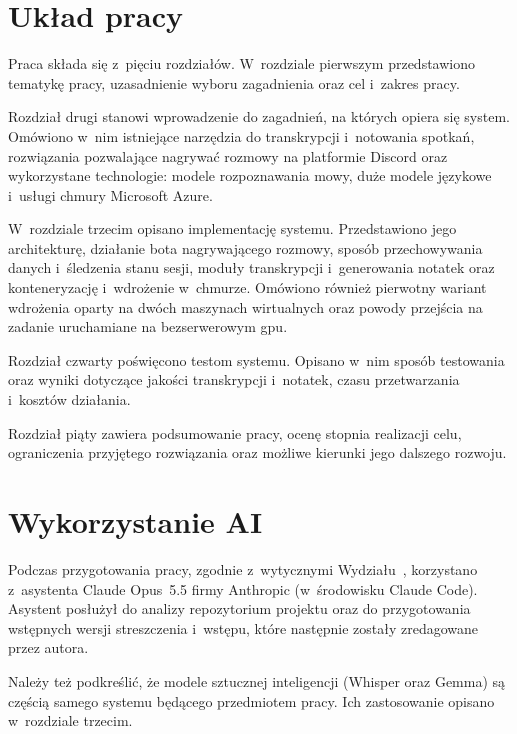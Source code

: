 \section{Układ pracy}
\label{sec:wstep:uklad}


Praca składa się z~pięciu rozdziałów. W~rozdziale pierwszym przedstawiono
tematykę pracy, uzasadnienie wyboru zagadnienia oraz cel i~zakres pracy.

Rozdział drugi stanowi wprowadzenie do zagadnień, na których opiera się
system. Omówiono w~nim istniejące narzędzia do transkrypcji i~notowania
spotkań, rozwiązania pozwalające nagrywać rozmowy na platformie Discord oraz
wykorzystane technologie: modele rozpoznawania mowy, duże modele językowe
i~usługi chmury Microsoft Azure.

W~rozdziale trzecim opisano implementację systemu. Przedstawiono jego
architekturę, działanie bota nagrywającego rozmowy, sposób przechowywania
danych i~śledzenia stanu sesji, moduły transkrypcji i~generowania notatek
oraz konteneryzację i~wdrożenie w~chmurze. Omówiono również pierwotny wariant
wdrożenia oparty na dwóch maszynach wirtualnych oraz powody przejścia na
zadanie uruchamiane na bezserwerowym \acs{gpu}.

Rozdział czwarty poświęcono testom systemu. Opisano w~nim sposób testowania
oraz wyniki dotyczące jakości transkrypcji i~notatek, czasu przetwarzania
i~kosztów działania.

Rozdział piąty zawiera podsumowanie pracy, ocenę stopnia realizacji celu,
ograniczenia przyjętego rozwiązania oraz możliwe kierunki jego dalszego
rozwoju.

\section{Wykorzystanie AI}
\label{sec:wstep:ai}


Podczas przygotowania pracy, zgodnie z~wytycznymi
Wydziału~\cite{WITWytyczneSI}, korzystano z~asystenta Claude Opus~5.5 firmy
Anthropic (w~środowisku Claude Code). Asystent posłużył do analizy
repozytorium projektu oraz do przygotowania wstępnych wersji streszczenia
i~wstępu, które następnie zostały zredagowane przez autora.

Należy też podkreślić, że modele sztucznej inteligencji (Whisper oraz Gemma)
są częścią samego systemu będącego przedmiotem pracy. Ich zastosowanie
opisano w~rozdziale trzecim.
